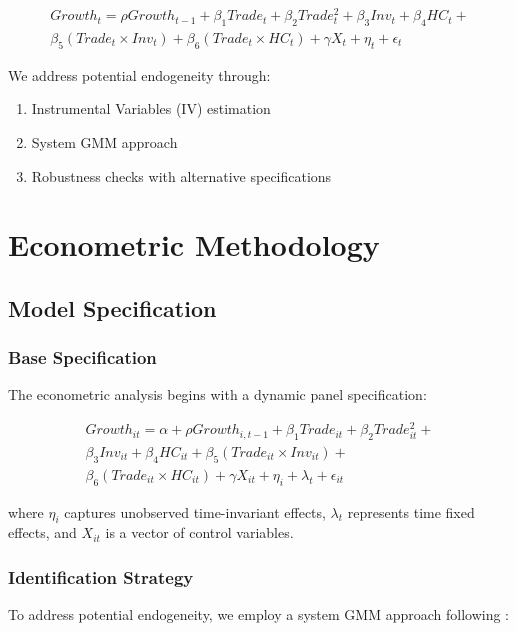 \documentclass[12pt,a4paper]{article}
\theoremstyle{definition}
\begin{document}
\begin{equation}
\begin{split}
Growth_{t} = \rho Growth_{t-1} + \beta_1 Trade_t + \beta_2 Trade_t^2 + \beta_3 Inv_t + \beta_4 HC_t + \\
\beta_5 (Trade_t \times Inv_t) + \beta_6 (Trade_t \times HC_t) + \gamma X_t + \eta_t + \epsilon_t
\end{split}
\end{equation}

We address potential endogeneity through:
\begin{enumerate}
    \item Instrumental Variables (IV) estimation
    \item System GMM approach
    \item Robustness checks with alternative specifications
\end{enumerate}

\section{Econometric Methodology}
\subsection{Model Specification}
\subsubsection{Base Specification}
The econometric analysis begins with a dynamic panel specification:

\begin{equation}
\begin{split}
Growth_{it} = \alpha + \rho Growth_{i,t-1} + \beta_1 Trade_{it} + \beta_2 Trade_{it}^2 + \\
\beta_3 Inv_{it} + \beta_4 HC_{it} + \beta_5 (Trade_{it} \times Inv_{it}) + \\
\beta_6 (Trade_{it} \times HC_{it}) + \gamma X_{it} + \eta_i + \lambda_t + \epsilon_{it}
\end{split}
\end{equation}

where $\eta_i$ captures unobserved time-invariant effects, $\lambda_t$ represents time fixed effects, and $X_{it}$ is a vector of control variables.

\subsubsection{Identification Strategy}
To address potential endogeneity, we employ a system GMM approach following \cite{blundell1998initial}:
\end{document}
